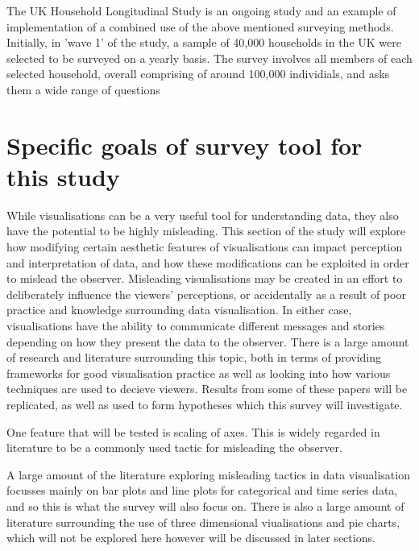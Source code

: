 The UK Household Longitudinal Study is an ongoing study and an example of implementation of a combined use of the above mentioned surveying methods.
Initially, in 'wave 1' of the study, a sample of 40,000 households in the UK were selected to be surveyed on a yearly basis. The survey involves all 
members of each selected household, overall comprising of around 100,000 individials, and asks them a wide range of questions





\section{Specific goals of survey tool for this study}
While visualisations can be a very useful tool for understanding data, they also have the potential to be highly misleading. This section of the 
study will explore how modifying certain aesthetic features of visualisations can impact perception and interpretation of data, and how these 
modifications can be exploited in order to mislead the observer. Misleading visualisations may be created in an effort to deliberately influence the 
viewers' perceptions, or accidentally as a result of poor practice and knowledge surrounding data visualisation. In either case, visualisations have the
ability to communicate different messages and stories depending on how they present the data to the observer. There is a large amount of research and 
literature surrounding this topic, both in terms of providing frameworks for good visualisation practice as well as looking into how various techniques 
are used to decieve viewers. Results from some of these papers will be replicated, as well as used to form hypotheses which this survey will investigate.\newline

One feature that will be tested is scaling of axes. This is widely regarded in literature to be a commonly used tactic for misleading the observer.

 





A large amount of the literature exploring misleading tactics in data visualisation focusses mainly on bar plots and line plots for categorical and 
time series data, and so this is what the survey will also focus on. There is also a large amount of literature surrounding the use of three dimensional 
viualisations and pie charts, which will not be explored here however will be discussed in later sections. 


